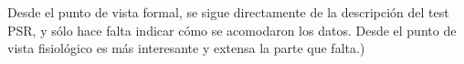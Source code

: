 \documentclass[12pt,a4paper]{mitthesis}
\begin{document}
Desde el punto de vista formal, se sigue directamente de la descripci\'on del test PSR, y s\'olo
hace falta indicar c\'omo se acomodaron los datos. Desde el punto de vista fisiol\'ogico es m\'as
interesante y extensa la parte que falta.)




{}
%


\end{document}
